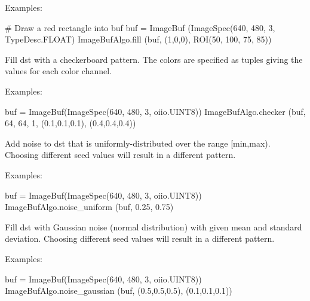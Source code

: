 \smallskip
\noindent Examples:
\begin{code}
    # Draw a red rectangle into buf
    buf = ImageBuf (ImageSpec(640, 480, 3, TypeDesc.FLOAT)
    ImageBufAlgo.fill (buf, (1,0,0), ROI(50, 100, 75, 85))
\end{code}
\apiend


 

Fill {\cf dst} with a checkerboard pattern. The colors are specified as
tuples giving the values for each color channel.

\smallskip
\noindent Examples:
\begin{code}
    buf = ImageBuf(ImageSpec(640, 480, 3, oiio.UINT8))
    ImageBufAlgo.checker (buf, 64, 64, 1, (0.1,0.1,0.1), (0.4,0.4,0.4))
\end{code}
\apiend


 

Add noise to {\cf dst} that is uniformly-distributed over the range
{\cf [min,max)}.  Choosing different seed values will result in a different pattern.

\smallskip
\noindent Examples:
\begin{code}
    buf = ImageBuf(ImageSpec(640, 480, 3, oiio.UINT8))
    ImageBufAlgo.noise_uniform (buf, 0.25, 0.75)
\end{code}
\apiend


 

Fill {\cf dst} with Gaussian noise (normal distribution) with given mean
and standard deviation.
Choosing different seed values will result in a different pattern.

\smallskip
\noindent Examples:
\begin{code}
    buf = ImageBuf(ImageSpec(640, 480, 3, oiio.UINT8))
    ImageBufAlgo.noise_gaussian (buf, (0.5,0.5,0.5), (0.1,0.1,0.1))
\end{code}
\apiend


